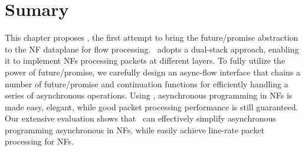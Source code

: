 \section{Sumary}
\label{sec:netstar-conclusion}

This chapter proposes \netstar, the first attempt to bring the future/promise abstraction to the NF dataplane for flow processing.  \netstar~adopts a dual-stack approach, enabling it to implement NFs processing packets at different layers. To fully utilize the power of future/promise, we carefully design an async-flow interface that chains a number of future/promise and continuation functions for efficiently handling a series of asynchronous operations. Using \netstar, asynchronous programming in NFs is made easy, elegant, while good packet processing performance is still guaranteed. Our extensive evaluation shows that \netstar~can effectively simplify asynchronous programming asynchronous in NFs, while easily achieve line-rate packet processing for NFs.
